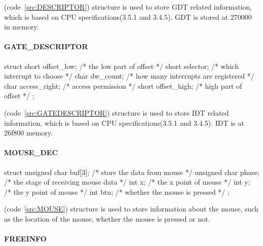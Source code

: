 \documentclass{swfcthesis}
\begin{document}
(code~\ref{src:DESCRIPTOR}) structure is
used to store GDT related information, which is based on CPU specifications(3.5.1 and
3.4.5\cite{intel_3a}). GDT is stored at 270000 in memory.


\paragraph{GATE\_DESCRIPTOR}

\begin{listing}[H]
  \begin{codeblock}
\begin{ccode}
struct 
{ 
  short offset_low;   /* the low part of offset */
  short selector;     /* which interrupt to choose */
  char dw_count;      /* how many interrupts are registered */
  char access_right;  /* access permission */
  short  offset_high; /* high part of offset */
};
\end{ccode}
  \end{codeblock}
  \caption{\texttt{struct GATE\_DESCRIPTOR}}\label{src:GATEDESCRIPTOR}
\end{listing}

(code~\ref{src:GATEDESCRIPTOR}) structure is used to
store IDT related information, which is based on CPU specifications(3.5.1 and
3.4.5\cite{intel_3a}). IDT is at 26f800 memory.


\paragraph{MOUSE\_DEC}

\begin{listing}[H]
  \begin{codeblock}
\begin{ccode}
struct 
{ 
  unsigned char buf[3]; /* store the data from mouse */
  unsigned char phase;  /* the stage of receiving mouse data */
  int x;                /* the x point of mouse */
  int y;                /* the y point of mouse */
  int btn;              /* whether the mouse is pressed */
};
\end{ccode}
  \end{codeblock}
  \caption{\texttt{struct MOUSE\_DEC}}\label{src:MOUSE}
\end{listing}

(code~\ref{src:MOUSE}) structure is used to store information about the mouse, such as the
location of the mouse, whether the mouse is pressed or not.

\paragraph{FREEINFO}
\end{document}
